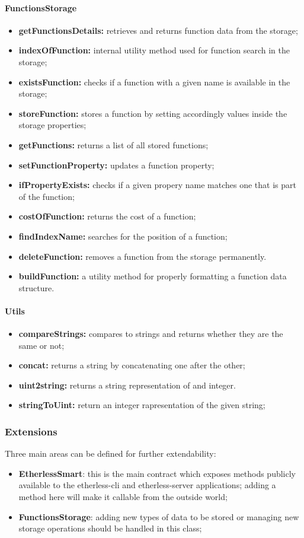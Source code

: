 \paragraph{FunctionsStorage}
\begin{itemize}
	\item \textbf{getFunctionsDetails:} retrieves and returns function data from the storage;
	\item \textbf{indexOfFunction:} internal utility method used for function search in the storage;
	\item \textbf{existsFunction:} checks if a function with a given name is available in the storage;
	\item \textbf{storeFunction:} stores a function by setting accordingly values inside the storage properties;
	\item \textbf{getFunctions:} returns a list of all stored functions;
	\item \textbf{setFunctionProperty:} updates a function property;
	\item \textbf{ifPropertyExists:} checks if a given propery name matches one that is part of the function;
	\item \textbf{costOfFunction:}  returns the cost of a function;
	\item \textbf{findIndexName:} searches for the position of a function;
	\item \textbf{deleteFunction:} removes a function from the storage permanently. 
	\item \textbf{buildFunction:} a utility method for properly formatting a function data structure.
\end{itemize}
\paragraph{Utils}
\begin{itemize}
	\item \textbf{compareStrings:} compares to strings and returns whether they are the same or not;
	\item \textbf{concat:} returns a string by concatenating one after the other;
	\item \textbf{uint2string:} returns a string representation of and integer.
	\item \textbf{stringToUint:} return an integer rapresentation of the given string;
\end{itemize}
\subsubsection{Extensions}
Three main areas can be defined for further extendability:
\begin{itemize}
	\item \textbf{EtherlessSmart}: this is the main contract which exposes methods publicly available to the etherless-cli and etherless-server applications; adding a method here will make it callable from the outside world;
	\item \textbf{FunctionsStorage}: adding new types of data to be stored or managing new storage operations should be handled in this class;
\end{itemize}



